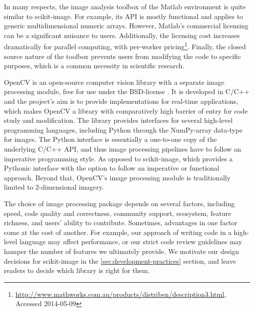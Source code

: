   In many respects, the image analysis toolbox of the Matlab environment is
  quite similar to scikit-image. For example, its API is mostly functional and
  applies to generic multidimensional numeric arrays. However, Matlab's
  commercial licensing can be a significant nuisance to users. Additionally,
  the licensing cost increases dramatically for parallel computing, with
  per-worker pricing\footnote{\url{http://www.mathworks.com.au/products/distriben/description3.html}, Accessed 2014-05-09}.
  Finally, the closed source nature of the toolbox prevents users from
  modifying the code to specific purposes, which is a common necessity in
  scientific research.

  OpenCV is an open-source computer vision library with a separate image
  processing module, free for use under the BSD-license \citep{opencv}. It is
  developed in C/C++ and the project's aim is to provide implementations for
  real-time applications, which makes OpenCV a library with comparatively high
  barrier of entry for code study and modification. The library provides
  interfaces for several high-level programming languages, including Python
  through the NumPy-array data-type for images. The Python interface is
  essentially a one-to-one copy of the underlying C/C++ API, and thus image
  processing pipelines have to follow an imperative programming style. As
  opposed to scikit-image, which provides a Pythonic interface with the option
  to follow an imperative or functional approach. Beyond that, OpenCV's image
  processing module is traditionally limited to 2-dimensional imagery.

  The choice of image processing package depends on several factors, including
  speed, code quality and correctness, community support, ecosystem, feature
  richness, and users' ability to contribute. Sometimes, advantages in one
  factor come at the cost of another. For example, our approach of writing code
  in a high-level language may affect performance, or our strict code review
  guidelines may hamper the number of features we ultimately provide. We
  motivate our design decisions for scikit-image in the
  \ref{sec:development-practices} section, and leave readers to decide which
  library is right for them.
